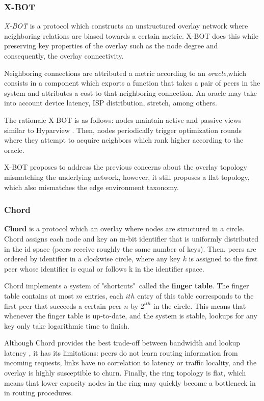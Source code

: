 \subsubsection*{X-BOT}

\textit{X-BOT} \cite{leitao2012x} is a protocol which constructs an unstructured overlay network where neighboring relations are biased towards a certain metric. X-BOT does this while preserving key properties of the overlay such as the node degree and consequently, the overlay connectivity.

Neighboring connections are attributed a metric according to an \textit{oracle},which consists in a component which exports a function that takes a pair of peers in the system and attributes a cost to that neighboring connection. An oracle may take into account device latency, ISP distribution, stretch, among others. 

The rationale X-BOT is as follows: nodes maintain active and passive views similar to Hyparview \cite{Hyparview}. Then, nodes periodically trigger optimization rounds where they attempt to acquire neighbors which rank higher according to the oracle.

X-BOT proposes to address the previous concerns about the overlay topology mismatching the underlying network, however, it still proposes a flat topology, which also mismatches the edge environment taxonomy. 

\subsubsection* {Chord}

\textbf{Chord} \cite{stoica2003chord} is a protocol which an overlay where nodes are structured in a circle. Chord assigns each node and key an m-bit identifier that is uniformly distributed in the id space (peers receive roughly the same number of keys). Then, peers are ordered by identifier in a clockwise circle, where any key \(k\) is assigned to the first peer whose identifier is equal or follows k in the identifier space. 

Chord implements a system of "shortcuts"\ called the \textbf{finger table}. The finger table contains at most \(m\) entries, each $ith$ entry of this table corresponds to the first peer that succeeds a certain peer \(n\) by \(2^{ith}\) in the circle. This means that whenever the finger table is up-to-date, and the system is stable, lookups for any key only take logarithmic time to finish. 

Although Chord provides the best trade-off between bandwidth and lookup latency \cite{dht_performance_churn}, it has its limitations: peers do not learn routing information from incoming requests, links have no correlation to latency or traffic locality, and the overlay is highly susceptible to churn. Finally, the ring topology is flat, which means that lower capacity nodes in the ring may quickly become a bottleneck in in routing procedures.

